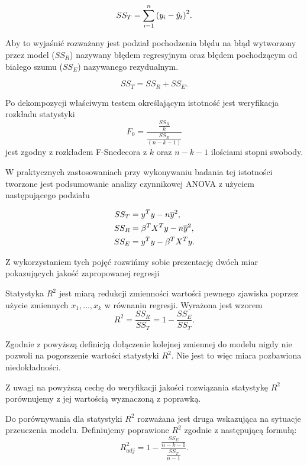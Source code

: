 \documentclass[10pt,a4paper]{book}
\begin{document}
$$
SS_T = \sum_{i=1}^{n} \bracket{y_i - \predict{y}{t}}^2 .
$$

Aby to wyjaśnić rozważany jest podział pochodzenia błędu na błąd wytworzony przez model ($SS_R$) nazywany błędem regresyjnym oraz błędem pochodzącym od białego szumu ($SS_E$) nazywanego rezydualnym.

$$
SS_T = SS_R + SS_E.
$$ 

Po dekompozycji właściwym testem określającym istotność jest weryfikacja rozkładu statystyki
$$
F_0 = \frac{\frac{SS_R}{k}}{\frac{SS_E}{(n-k-1)}}
$$
jest zgodny z rozkładem F-Snedecora z $k$ oraz $n-k-1$ ilościami stopni swobody.

W praktycznych zastosowaniach przy wykonywaniu badania tej istotności tworzone jest podsumowanie analizy czynnikowej ANOVA z użyciem następującego podziału

\begin{align*}
SS_T & = {y}^Ty - n \overline{y}^2, \\
SS_R & = {\beta}^T{X}^Ty - n \overline{y}^2,\\
SS_E & = {y}^Ty - {\beta}^T{X}^Ty.
\end{align*}

Z wykorzystaniem tych pojęć rozwińmy sobie prezentację dwóch miar pokazujących jakość zapropowanej regresji

\begin{definition}
Statystyka $R^2$ jest miarą redukcji zmienności wartości pewnego zjawiska poprzez użycie zmiennych $x_1,\ldots,x_k$ w równaniu regresji. Wyrażona jest wzorem
$$
R^2 = \frac{SS_R}{SS_T} = 1 - \frac{SS_E}{SS_T	}.
$$ 
\end{definition}

\begin{remark}
Zgodnie z powyższą definicją dołączenie kolejnej zmiennej do modelu nigdy nie pozwoli na pogorszenie wartości statystyki $R^2$. Nie jest to więc miara pozbawiona niedokładności.
\end{remark}

Z uwagi na powyższą cechę do weryfikacji jakości rozwiązania statystykę $R^2$ porównujemy z jej wartością wyznaczoną z poprawką.

\begin{definition}
Do porównywania dla statystyki $R^2$ rozważana jest druga wskazująca na sytuacje przeuczenia modelu. Definiujemy poprawione $R^2$ zgodnie z następującą formułą:
$$
R_{adj}^2 = 1 - \frac{\frac{SS_E}{n-k-1}}{\frac{SS_T}{n-1}}.
$$
\end{definition}
\end{document}
